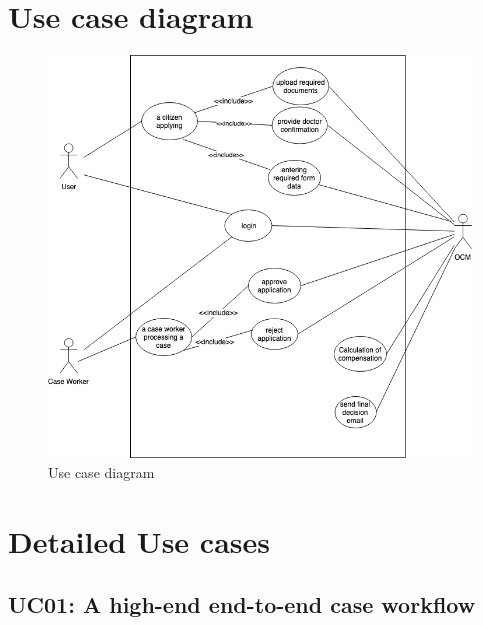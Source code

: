 \documentclass{article}
\begin{document}
\section{Use case diagram}
\begin{figure}[hbt!]
	\includegraphics[width=\textwidth]{img/use-cases}
	\caption{Use case diagram}
\end{figure}

\newpage
\section{Detailed Use cases}

\subsection{UC01: A high-end end-to-end case workflow}
\end{document}
